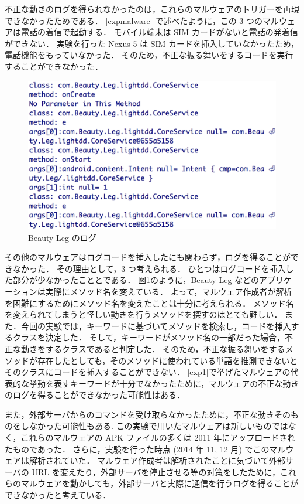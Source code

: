 不正な動きのログを得られなかったのは，これらのマルウェアのトリガーを再現できなかったためである．
\ref{expmalware} で述べたように，この 3 つのマルウェアは電話の着信で起動する．
モバイル端末は SIM カードがないと電話の発着信ができない．
実験を行った Nexus 5 は SIM カードを挿入していなかったため，電話機能をもっていなかった．
そのため，不正な振る舞いをするコードを実行することができなかった．

\begin{figure}[t]
\begin{center}
\graphicspath{{./epsfiles/}}
\includegraphics[scale=0.25]{beautyleg2.eps}
\end{center}
\caption{Beauty Leg のログ}
\label{leg}
\end{figure}

その他のマルウェアはログコードを挿入したにも関わらず，ログを得ることができなかった．
その理由として，3 つ考えられる．
ひとつはログコードを挿入した部分が少なかったこととである．
図\ref{leg}のように，Beauty Leg などのアプリケーションは実際にメソッド名を変えている．
よって，マルウェア作成者が解析を困難にするためにメソッド名を変えたことは十分に考えられる．
メソッド名を変えられてしまうと怪しい動きを行うメソッドを探すのはとても難しい．
また．今回の実験では，キーワードに基づいてメソッドを検索し，コードを挿入するクラスを決定した．
そして，キーワードがメソッド名の一部だった場合，不正な動きをするクラスであると判定した．
そのため，不正な振る舞いをするメソッドが存在したとしても，そのメソッドに使われている単語を推測できないとそのクラスにコードを挿入することができない．
\ref{exp1}で挙げたマルウェアの代表的な挙動を表すキーワードが十分でなかったために，マルウェアの不正な動きのログを得ることができなかった可能性はある．

また，外部サーバからのコマンドを受け取らなかったために，不正な動きそのものをしなかった可能性もある.
この実験で用いたマルウェアは新しいものではなく，これらのマルウェアの APK ファイルの多くは 2011 年にアップロードされたものであった\cite{malwaresite}．
さらに，実験を行った時点 (2014 年 11, 12 月) でこのマルウェアは解析されていた．
マルウェア作成者は解析されたことに気づいて外部サーバの URL を変えたり，外部サーバを停止させる等の対策をしたために，これらのマルウェアを動かしても，外部サーバと実際に通信を行うログを得ることができなかったと考えている．

